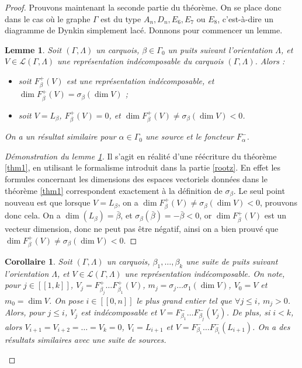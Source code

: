 \documentclass[a4paper,11pt]{article}
\newtheorem{lm}[thm]{Lemme}%
\newtheorem{cor}[thm]{Corollaire}%
\newcommand{\ent}[2]{[\![#1,#2]\!]}
\begin{document}
\begin{proof}
	Prouvons maintenant la seconde partie du théorème. On se place donc dans le cas où le graphe $\Gamma$ est du type $A_n,D_n,E_6,E_7$ ou $E_8$, c'est-à-dire un diagramme de Dynkin simplement lacé. Donnons pour commencer un lemme.
	\begin{lm}
		\label{lmbidon}
		Soit $(\Gamma,\Lambda)$ un carquois, $\beta\in\Gamma_0$ un puits suivant l'orientation $\Lambda$, et $V\in\mathscr L(\Gamma,\Lambda)$ une représentation indécomposable du carquois $(\Gamma,\Lambda)$. Alors :
		\begin{itemize}
			\item soit $F_\beta^+(V)$ est une représentation indécomposable, et $\dim F_\beta^+(V)=\sigma_\beta(\dim V)$ ;
			\item soit $V=L_\beta$, $F_\beta^+(V)=0$, et $\dim F_\beta^+(V)\neq\sigma_\beta(\dim V)<0$.
		\end{itemize}
On a un résultat similaire pour $\alpha\in\Gamma_0$ une source et le foncteur $F_\alpha^-$.
	\end{lm}
	\begin{proof}[Démonstration du lemme \ref{lmbidon}]
		Il s'agit en réalité d'une réécriture du théorème \ref{thm1}, en utilisant le formalisme introduit dans la partie \ref{rootz}. En effet les formules concernant les dimensions des espaces vectoriels données dans le théorème \ref{thm1} correspondent exactement à la définition de $\sigma_\beta$. Le seul point nouveau est que lorsque $V=L_\beta$, on a $\dim F_\beta^+(V)\neq\sigma_\beta(\dim V)<0$, prouvons donc cela. On a $\dim (L_\beta)=\bar\beta$, et $\sigma_\beta(\bar\beta)=-\bar\beta<0$, or $\dim F_\beta^+(V)$ est un vecteur dimension, donc ne peut pas être négatif, ainsi on a bien prouvé que $\dim F_\beta^+(V)\neq\sigma_\beta(\dim V)<0$.
	\end{proof}
	\begin{cor}
	\label{cor3.1}
	Soit $(\Gamma,\Lambda)$ un carquois, $\beta_1,\dots,\beta_k$ une suite de puits suivant l'orientation $\Lambda$, et $V\in\mathscr L(\Gamma,\Lambda)$ une représentation indécomposable. On note, pour $j\in\ent{1}{k}$,  $V_j=F_{\beta_j}^+\dots F_{\beta_1}^+(V)$, $m_j=\sigma_j\dots\sigma_1(\dim V)$, $V_0=V$ et $m_0=\dim V$. On pose $i\in\ent{0}{n}$ le plus grand entier tel que $\forall j\leq i$, $m_j>0$. Alors, pour $j\leq i$, $V_j$ est indécomposable et $V=F_{\beta_1}^-\dots F_{\beta_j}^-(V_j)$. De plus, si $i<k$, alors $V_{i+1}=V_{i+2}=\dots=V_{k}=0$, $V_i=L_{i+1}$ et $V=F_{\beta_1}^-\dots F_{\beta_{i}}^-(L_{i+1})$. On a des résultats similaires avec une suite de sources.
	\end{cor}

\end{proof}
\end{document}
